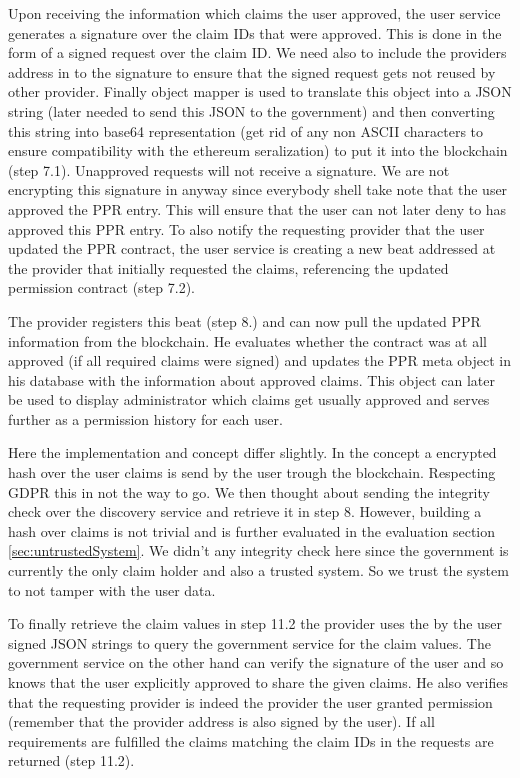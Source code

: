 Upon receiving the information which claims the user approved, the user service generates a signature over the claim IDs that were approved. This is done in the form of a signed request over the claim ID. We need also to include the providers address in to the signature to ensure that the signed request gets not reused by other provider. Finally object mapper is used to translate this object into a JSON string (later needed to send this JSON to the government) and then converting this string into base64 representation (get rid of any non ASCII characters to ensure compatibility with the ethereum seralization) to put it into the blockchain (step 7.1). Unapproved requests will not receive a signature. We are not encrypting this signature in anyway since everybody shell take note that the user approved the PPR entry. This will ensure that the user can not later deny to has approved this PPR entry. To also notify the requesting provider that the user updated the PPR contract, the user service is creating a new beat addressed at the provider that initially requested the claims, referencing the updated permission contract (step 7.2). 

The provider registers this beat (step 8.) and can now pull the updated PPR information from the blockchain. He evaluates whether the contract was at all approved (if all required claims were signed) and updates the PPR meta object in his database with the information about approved claims. This object can later be used to display administrator which claims get usually approved and serves further as a permission history for each user. 

Here the implementation and concept differ slightly. In the concept a encrypted hash over the user claims is send by the user trough the blockchain. Respecting GDPR this in not the way to go. We then thought about sending the integrity check over the discovery service and retrieve it in step 8. However, building a hash over claims is not trivial and is further evaluated in the evaluation section \ref{sec:untrustedSystem}. We didn’t any integrity check here since the government is currently the only claim holder and also a trusted system. So we trust the system to not tamper with the user data. 

To finally retrieve the claim values in step 11.2 the provider uses the by the user signed JSON strings to query the government service for the claim values. The government service on the other hand can verify the signature of the user and so knows that the user explicitly approved to share the given claims. He also verifies that the requesting provider is indeed the provider the user granted permission (remember that the provider address is also signed by the user). If all requirements are fulfilled the claims matching the claim IDs in the requests are returned (step 11.2).

